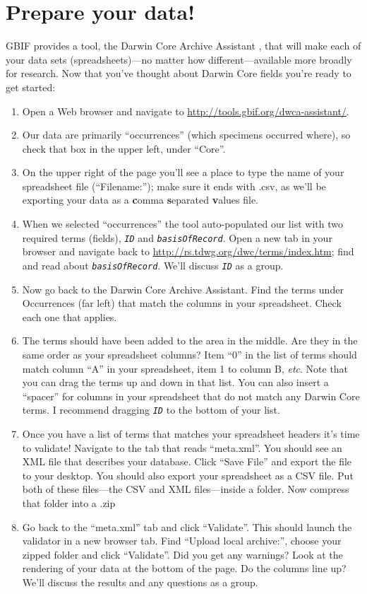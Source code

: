 \documentclass[11pt,letterpaper]{article}
\newcommand{\latinword}[1]{\texttt{\itshape #1}}%
\begin{document}
\section*{Prepare your data!}
GBIF provides a tool, the Darwin Core Archive Assistant \citep{DWCaGuide}, that will make each of your data sets (spreadsheets)---no matter how different---available more broadly for research. Now that you've thought about Darwin Core fields you're ready to get started:
\begin{enumerate}
\item Open a Web browser and navigate to \url{http://tools.gbif.org/dwca-assistant/}.
\item Our data are primarily ``occurrences'' (which specimens occurred where), so check that box in the upper left, under ``Core''.
\item On the upper right of the page you'll see a place to type the name of your spreadsheet file (``Filename:''); make sure it ends with .csv, as we'll be exporting your data as a \textbf{c}omma \textbf{s}eparated \textbf{v}alues file.
\item When we selected ``occurrences'' the tool auto-populated our list with two required terms (fields), \latinword{ID} and \latinword{basisOfRecord}. Open a new tab in your browser and navigate back to \url{http://rs.tdwg.org/dwc/terms/index.htm}; find and read about \latinword{basisOfRecord}. We'll discuss \latinword{ID} as a group.
\item Now go back to the Darwin Core Archive Assistant. Find the terms under Occurrences (far left) that match the columns in your spreadsheet. Check each one that applies.
\item The terms should have been added to the area in the middle. Are they in the same order as your spreadsheet columns? Item ``0'' in the list of terms should match column ``A'' in your spreadsheet, item 1 to column B, \textit{etc}. Note that you can drag the terms up and down in that list. You can also insert a ``spacer'' for columns in your spreadsheet that do not match any Darwin Core terms. I recommend dragging \latinword{ID} to the bottom of your list.
\item Once you have a list of terms that matches your spreadsheet headers it's time to validate! Navigate to the tab that reads ``meta.xml''. You should see an XML file that describes your database. Click ``Save File'' and export the file to your desktop. You should also export your spreadsheet as a CSV file. Put both of these files---the CSV and XML files---inside a folder. Now compress that folder into a .zip
\item Go back to the ``meta.xml'' tab and click ``Validate''. This should launch the validator in a new browser tab. Find ``Upload local archive:'', choose your zipped folder and click ``Validate''. Did you get any warnings? Look at the rendering of your data at the bottom of the page. Do the columns line up? We'll discuss the results and any questions as a group.
\end{enumerate}
\end{document}
